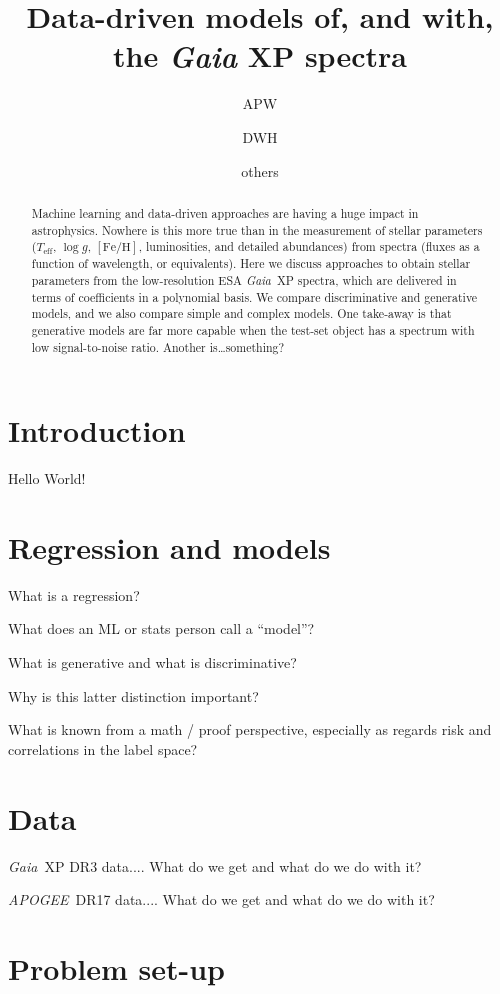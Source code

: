 \documentclass[modern]{aastex631}
\newcommand{\acronym}[1]{\small{#1}}
\newcommand{\project}[1]{\textsl{#1}}
\newcommand{\Gaia}{\project{Gaia}}
\newcommand{\APOGEE}{\project{\acronym{APOGEE}}}
\newcommand{\teff}{T_{\mathrm{eff}}}
\newcommand{\logg}{\log g}
\newcommand{\feh}{[\mathrm{Fe}/\mathrm{H}]}
\begin{document}
\title{Data-driven models of, and with, the \textsl{Gaia} XP spectra}

\author{APW}
\author{DWH}
\author{others}

\begin{abstract}\noindent %
  Machine learning and data-driven approaches are having a huge impact in astrophysics.
  Nowhere is this more true than in the measurement of stellar parameters ($\teff$, $\logg$, $\feh$, luminosities, and detailed abundances) from spectra (fluxes as a function of wavelength, or equivalents).
  Here we discuss approaches to obtain stellar parameters from the low-resolution ESA \Gaia\ XP spectra, which are delivered in terms of coefficients in a polynomial basis.
  We compare discriminative and generative models, and we also compare simple and complex models.
  One take-away is that generative models are far more capable when the test-set object has a spectrum with low signal-to-noise ratio.
  Another is\ldots something?
\end{abstract}

\section{Introduction} \label{sec:intro}

Hello World!

\section{Regression and models}

What is a regression?

What does an ML or stats person call a ``model''?

What is generative and what is discriminative?

Why is this latter distinction important?

What is known from a math / proof perspective, especially as regards risk and correlations in the label space?

\section{Data}

\Gaia\ XP DR3 data.... What do we get and what do we do with it?

\APOGEE\ DR17 data.... What do we get and what do we do with it?

\section{Problem set-up}
\end{document}
